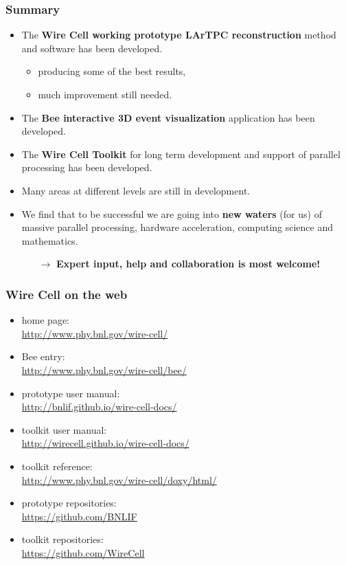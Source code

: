 \documentclass[xcolor=dvipsnames]{beamer}
\begin{document}
\begin{frame}
  \frametitle{Summary}
  \begin{itemize}
  \item The \textbf{Wire Cell working prototype LArTPC reconstruction} method and software has been developed.
    \begin{itemize}
    \item producing some of the best results,
    \item much improvement still needed.
    \end{itemize}
  \item The \textbf{Bee interactive 3D event visualization} application has been developed.
  \item The \textbf{Wire Cell Toolkit} for long term development and support of
    parallel processing has been developed.
  \item Many areas at different levels are still in development.
  \item We find that to be successful we are going into \textbf{new waters}
    (for us) of massive parallel processing, hardware acceleration,
    computing science and mathematics.
    \begin{itemize}
    \item[$\rightarrow$] \textbf{Expert input, help and collaboration is most welcome!}
    \end{itemize}
  \end{itemize}
\end{frame}

\begin{frame}
  \frametitle{Wire Cell on the web}

  \begin{itemize}
  \item home page: \\ \url{http://www.phy.bnl.gov/wire-cell/}
  \item Bee entry: \\ \url{http://www.phy.bnl.gov/wire-cell/bee/}
  \item prototype user manual: \\ \url{http://bnlif.github.io/wire-cell-docs/}
  \item toolkit user manual: \\ \url{http://wirecell.github.io/wire-cell-docs/}
  \item toolkit reference: \\ \url{http://www.phy.bnl.gov/wire-cell/doxy/html/}
  \item prototype repositories: \\ \url{https://github.com/BNLIF}
  \item toolkit repositories: \\ \url{https://github.com/WireCell}
  \end{itemize}
\end{frame}
\end{document}
